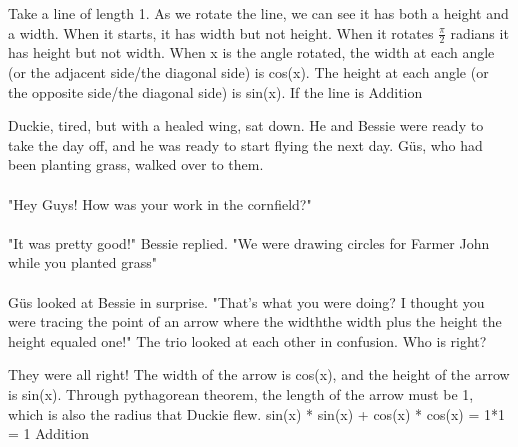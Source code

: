 \documentclass[a4paper,11pt ]{book}
\begin{document}
 {}
 {Take a line of length 1. As we rotate the line, we can see it has both a height and a width. When it starts, it has width but not height. When it rotates $\frac{\pi}{2}$ radians it has height but not width. When x is the angle rotated, the width at each angle (or the adjacent side/the diagonal side) is cos(x). The height at each angle (or the opposite side/the diagonal side) is sin(x). If the line is}
 {Addition}
 {Duckie, tired, but with a healed wing, sat down. He and Bessie were ready to take the day off, and he was ready to start flying the next day. Güs, who had been planting grass, walked over to them. 
 \paragraph{} "Hey Guys! How was your work in the cornfield?"
 \paragraph{} "It was pretty good!" Bessie replied. "We were drawing circles for Farmer John while you planted grass"
 \paragraph{} Güs looked at Bessie in surprise. "That's what you were doing? I thought you were tracing the point of an arrow where the width\texttimes the width plus the height \texttimes the height equaled one!"
 The trio looked at each other in confusion. Who is right?}
 {They were all right! The width of the arrow is cos(x), and the height of the arrow is sin(x). Through pythagorean theorem, the length of the arrow must be 1, which is also the radius that Duckie flew.}
 {sin(x) * sin(x) + cos(x) * cos(x) = 1*1 = 1}
 {Addition}
\end{document}
